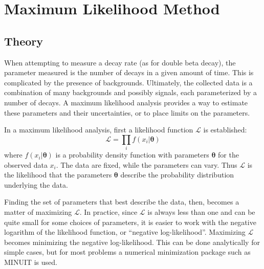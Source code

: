 \documentclass[herrin-thesis.tex]{subfiles}
\begin{document}
\section{Maximum Likelihood Method}
\subsection{Theory}
\label{sec:analysis_ml_theory}
When attempting to measure a decay rate (as for double beta decay), the parameter measured is the number of decays in a given amount of time. This is complicated by the presence of backgrounds. Ultimately, the collected data is a combination of many backgrounds and possibly signals, each parameterized by a number of decays. A maximum likelihood analysis provides a way to estimate these parameters and their uncertainties, or to place limits on the parameters.

In a maximum likelihood analysis, first a likelihood function \(\mathcal{L}\) is established:
\begin{equation}
\mathcal{L} = \prod_i f(x_i|\boldsymbol{\theta})
\end{equation}
where \(f(x_i|\boldsymbol{\theta})\) is a probability density function with parameters \(\boldsymbol{\theta}\) for the observed data \(x_i\). The data are fixed, while the parameters can vary. Thus \(\mathcal{L}\) is the likelihood that the parameters \(\boldsymbol{\theta}\) describe the probability distribution underlying the data.

Finding the set of parameters that best describe the data, then, becomes a matter of maximizing \(\mathcal{L}\). In practice, since \(\mathcal{L}\) is always less than one and can be quite small for some choices of parameters, it is easier to work with the negative logarithm of the likelihood function, or ``negative log-likelihood''. Maximizing \(\mathcal{L}\) becomes minimizing the negative log-likelihood. This can be done analytically for simple cases, but for most problems a numerical minimization package such as MINUIT \cite{James:1975kx} is used.
\end{document}
